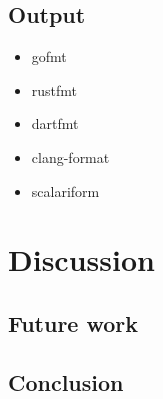 \documentclass[11pt,a4paper]{article}
\begin{document}
\subsection{Output}
\begin{itemize}
  \item gofmt
  \item rustfmt
  \item dartfmt
  \item clang-format
  \item scalariform
\end{itemize}
\section{Discussion}
\subsection{Future work}
\subsection{Conclusion}
\printbibliography{}
\end{document}
